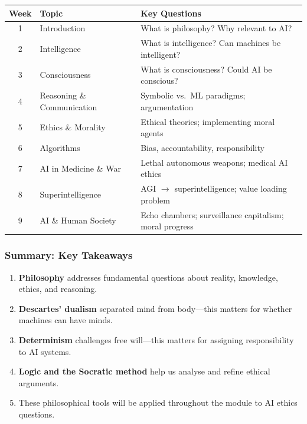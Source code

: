 \begin{center}
\renewcommand{\arraystretch}{1.3}
\begin{tabular}{@{} c l p{6.5cm} @{}}
\toprule
\textbf{Week} & \textbf{Topic} & \textbf{Key Questions} \\
\midrule
1 & Introduction & What is philosophy? Why relevant to AI? \\
2 & Intelligence & What is intelligence? Can machines be intelligent? \\
3 & Consciousness & What is consciousness? Could AI be conscious? \\
4 & Reasoning \& Communication & Symbolic vs.\ ML paradigms; argumentation \\
5 & Ethics \& Morality & Ethical theories; implementing moral agents \\
6 & Algorithms & Bias, accountability, responsibility \\
7 & AI in Medicine \& War & Lethal autonomous weapons; medical AI ethics \\
8 & Superintelligence & AGI $\to$ superintelligence; value loading problem \\
9 & AI \& Human Society & Echo chambers; surveillance capitalism; moral progress \\
\bottomrule
\end{tabular}
\end{center}

\bigseparator

\subsubsection{Summary: Key Takeaways}

\begin{thmbox}
\begin{enumerate}
  \item \textbf{Philosophy} addresses fundamental questions about reality, knowledge, ethics, and reasoning.
  \item \textbf{Descartes' dualism} separated mind from body---this matters for whether machines can have minds.
  \item \textbf{Determinism} challenges free will---this matters for assigning responsibility to AI systems.
  \item \textbf{Logic and the Socratic method} help us analyse and refine ethical arguments.
  \item These philosophical tools will be applied throughout the module to AI ethics questions.
\end{enumerate}
\end{thmbox}

